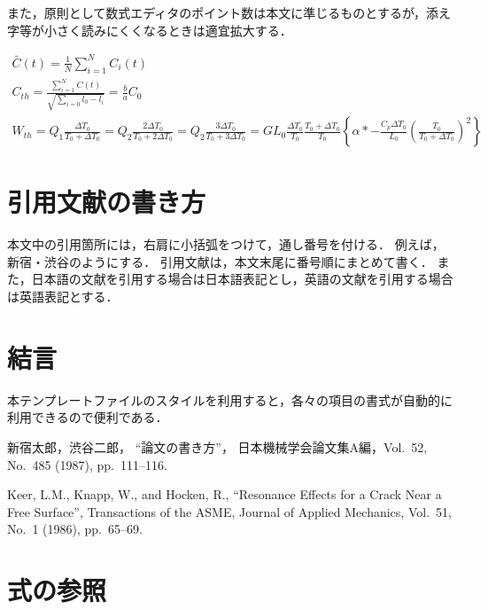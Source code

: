 \documentclass[a4paper, 10pt, dvips, fleqn, uplatex]{jsarticle}
\begin{document}
また，原則として数式エディタのポイント数は本文に準じるものとするが，添え字等が小さく読みにくくなるときは適宜拡大する．

\begin{gather}
  \bar{C}(t) = \frac{1}{N}\sum^{N}_{i=1}{C_{i}(t)} \\
  C_{th} = \frac{\displaystyle \sum^{N}_{i=1}{C(t)}}{\sqrt{\displaystyle \sum^{}_{i=0}{l_{0}-l_{i}}}}
  = \frac{b}{a}C_{0} \\
  W_{th} = Q_{1}\frac{\Delta T_{0}}{T_{0} + \Delta T_{0}}
  = Q_{2}\frac{2\Delta T_{0}}{T_{0} + 2\Delta T_{0}}
  = Q_{2}\frac{3\Delta T_{0}}{T_{0} + 3\Delta T_{0}}
  = GL_{0}\frac{\Delta T_{0}}{T_{0}}\frac{T_{0} + \Delta T_{0}}{T_{0}}
  \left\{ \alpha \ast -\frac{C_{p}\Delta T_{0}}{L_{0}}
  \left( \frac{T_{0}}{T_{0} + \Delta T_{0}} \right)^{2} \right\}
\end{gather}


\section{引用文献の書き方}

本文中の引用箇所には，右肩に小括弧をつけて，通し番号を付ける．
例えば，新宿・渋谷\cite{shinjuku,keer}のようにする．
引用文献は，本文末尾に番号順にまとめて書く．
また，日本語の文献を引用する場合は日本語表記とし，英語の文献を引用する場合は英語表記とする．


\section{結言}

本テンプレートファイルのスタイルを利用すると，各々の項目の書式が自動的に利用できるので便利である．


\begin{thebibliography}{10}
新宿太郎，渋谷二郎，
``論文の書き方''，
日本機械学会論文集A編，Vol.~52, No.~485 (1987), pp.~111--116.

Keer, L.M., Knapp, W., and Hocken, R., ``Resonance Effects for a
Crack Near a Free Surface'', Transactions of the ASME, Journal
of Applied Mechanics, Vol.~51, No.~1 (1986), pp.~65--69.


\end{thebibliography}

\newpage

\appendix

 \section{式の参照}
\end{document}
